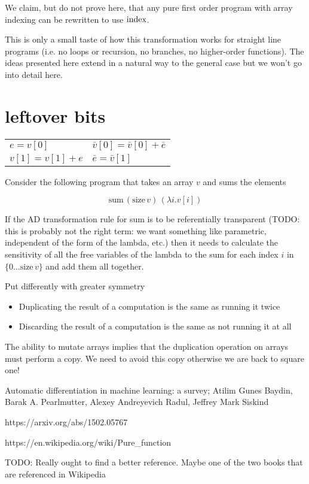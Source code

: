 \documentclass[12pt]{article}
\begin{document}
We claim, but do not prove here, that any pure first order program
with array indexing can be rewritten to use $\mathrm{index}$.

This is only a small taste of how this transformation works for
straight line programs (i.e. no loops or recursion, no branches, no
higher-order functions).  The ideas presented here extend in a natural
way to the general case but we won't go into detail here.

\section{leftover bits}

\begin{tabular}[t]{ll}
  $e = v[0]$
  &
  $\bar{v}[0] = \bar{v}[0] + \bar{e}$
  \\
  
  $v[1] = v[1] + e$
  &
  $\bar{e} = \bar{v}[1]$
  \\
\end{tabular}

Consider the following program that takes an array $v$ and sums the
elements

\[
\textrm{sum} \, (\textrm{size} \, v) \, (\lambda i. v[i])
\]

If the AD transformation rule for sum is to be referentially
transparent (TODO: this is probably not the right term: we want
something like parametric, independent of the form of the lambda,
etc.) then it needs to calculate the sensitivity of all the free
variables of the lambda to the sum for each index $i$ in $\{ 0 \ldots
\textrm{size} \, v\}$ and add them all together.  

Put differently with greater symmetry

\begin{itemize}
 \item Duplicating the result of a computation is the same as running
   it twice

 \item Discarding the result of a computation is the same as not
   running it at all
\end{itemize}

The ability to mutate arrays implies that the duplication operation on
arrays must perform a copy.  We need to avoid this copy otherwise we
are back to square one!



\begin{thebibliography}{9}

  Automatic differentiation in machine learning: a survey;
  Atilim Gunes Baydin, Barak A. Pearlmutter, Alexey Andreyevich Radul, Jeffrey Mark Siskind
  
https://arxiv.org/abs/1502.05767
  
  https://en.wikipedia.org/wiki/Pure\_function

  TODO: Really ought to find a better reference.  Maybe one of the two
  books that are referenced in Wikipedia

\end{thebibliography}
\end{document}
